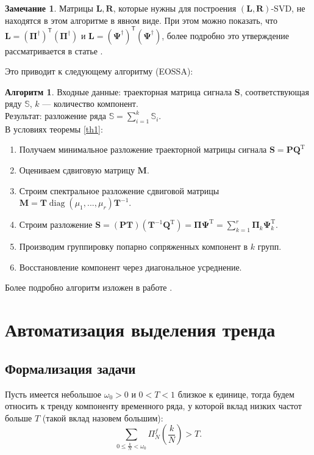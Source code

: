 \documentclass[specialist, substylefile = spbureport.rtx, subf,href,colorlinks=true, 12pt]{disser}
\theoremstyle{definition}
\newtheorem{algorithm}{Алгоритм}
\newtheorem{remark}{Замечание}
\DeclareMathOperator{\diag}{diag}
\begin{document}
\begin{remark}
    Матрицы $\mathbf{L}, \mathbf{R}$, которые нужны для построения $(\mathbf{L}, \mathbf{R})$-SVD, не находятся в этом алгоритме в явном виде. При этом можно показать, что $\mathbf{L} = (\mathbf{\Pi}^{\dag})^{\mathsf{T}}(\mathbf{\Pi}^{\dag})$ и $\mathbf{L} = (\mathbf{\Psi}^{\dag})^{\mathsf{T}}(\mathbf{\Psi}^{\dag})$, более подробно это утверждение рассматривается в статье \cite{Golyandina15}.
\end{remark}
Это приводит к следующему алгоритму (EOSSA):
\begin{algorithm}
Входные данные: траекторная матрица сигнала $\mathbf{S}$, соответствующая ряду $\mathbb{S}$, $k$ --- количество компонент.\\
Результат: разложение ряда $\mathbb{S} = \sum_{i = 1}^{k}\mathbb{S}_i$.\\
В условиях теоремы \ref{th1}:
\label{alg4}
    \begin{enumerate}
            \item Получаем минимальное разложение траекторной матрицы сигнала $\mathbf{S} = \mathbf{PQ}^{\mathrm{T}}$
            \item Оцениваем сдвиговую матрицу $\mathbf{M}$.
            \item Строим спектральное разложение сдвиговой матрицы $\mathbf{M} = \mathbf{T}\diag (\mu_1, ..., \mu_r)\mathbf{T}^{-1}$.
            \item Строим разложение $\mathbf{S} = (\mathbf{PT})(\mathbf{T}^{-1}\mathbf{Q}^{\mathrm{T}}) = \mathbf{\Pi \Psi}^{\mathrm{T}} = \sum_{k = 1}^{r}\mathbf{\Pi}_k\mathbf{\Psi}^{\mathrm{T}}_k$.
            \item Производим группировку попарно сопряженных компонент в $k$ групп.
            \item Восстановление компонент через диагональное усреднение.
        \end{enumerate}
\end{algorithm}
Более подробно алгоритм изложен в работе \cite{Shlemov}.




\chapter{Автоматизация выделения тренда}
\section{Формализация задачи}
Пусть имеется небольшое $\omega_0 > 0$ и $0 < T < 1$ близкое к единице, тогда будем относить к тренду компоненту временного ряда, у которой вклад низких частот больше $T$ (такой вклад назовем большим):
\begin{equation*}
    \sum\limits_{0 \leq \frac{k}{N} < \omega_0}\Pi_N^f(\frac{k}{N}) > T.
\end{equation*}
\end{document}
